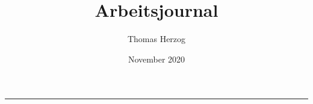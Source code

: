 \documentclass[a4paper, 12pt]{article}
\title{{\huge Arbeitsjournal}}
\author{Thomas Herzog}
\date{November 2020}
\begin{document}
	\maketitle
	\hrule
	\pagebreak
	
	\renewcommand{\contentsname}{Inhaltsverzeichnis}
	\tableofcontents
	\pagebreak
	
	
	\pagebreak
	
	
	\pagebreak
	
	
	\pagebreak
	
	
	
	
	\pagebreak
	
	\renewcommand{\refname}{Literaturverzeichnis}
	
	
	
\end{document}
